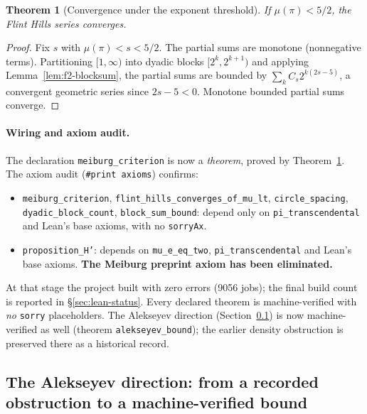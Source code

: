 \documentclass[11pt]{amsart}
\newtheorem{theorem}{Theorem}[section]
\theoremstyle{definition}
\theoremstyle{remark}
\numberwithin{equation}{section}
\newcommand{\irr}{\mu}
\begin{document}
\begin{theorem}[Convergence under the exponent threshold]\label{thm:f2-conv}
If $\irr(\pi)<5/2$, the Flint Hills series converges.
\end{theorem}
\begin{proof}
Fix $s$ with $\irr(\pi)<s<5/2$. The partial sums are monotone (nonnegative terms). Partitioning $[1,\infty)$ into dyadic blocks $[2^k,2^{k+1})$ and applying Lemma~\ref{lem:f2-blocksum}, the partial sums are bounded by $\sum_k C_s 2^{k(2s-5)}$, a convergent geometric series since $2s-5<0$. Monotone bounded partial sums converge.
\end{proof}

\paragraph{Wiring and axiom audit.} The declaration \texttt{meiburg\_\allowbreak{}criterion} is now a \emph{theorem}, proved by Theorem~\ref{thm:f2-conv}. The axiom audit (\texttt{\#print axioms}) confirms:
\begin{itemize}
\item \texttt{meiburg\_\allowbreak{}criterion}, \texttt{flint\_\allowbreak{}hills\_\allowbreak{}converges\_\allowbreak{}of\_\allowbreak{}mu\_\allowbreak{}lt}, \texttt{circle\_\allowbreak{}spacing}, \texttt{dyadic\_\allowbreak{}block\_\allowbreak{}count}, \texttt{block\_\allowbreak{}sum\_\allowbreak{}bound}: depend only on \texttt{pi\_transcendental} and Lean's base axioms, with no \texttt{sorryAx}.
\item \texttt{proposition\_\allowbreak{}H'}: depends on \texttt{mu\_e\_eq\_two}, \texttt{pi\_transcendental} and Lean's base axioms. \textbf{The Meiburg preprint axiom has been eliminated.}
\end{itemize}
At that stage the project built with zero errors (9056 jobs); the final build count is reported in \S\ref{sec:lean-status}. Every declared theorem is machine-verified with \emph{no} \texttt{sorry} placeholders. The Alekseyev direction (Section~\ref{sec:alekseyev}) is now machine-verified as well (theorem \texttt{alekseyev\_\allowbreak{}bound}); the earlier density obstruction is preserved there as a historical record.

\subsection{The Alekseyev direction: from a recorded obstruction to a machine-verified bound}\label{sec:alekseyev}
\end{document}
